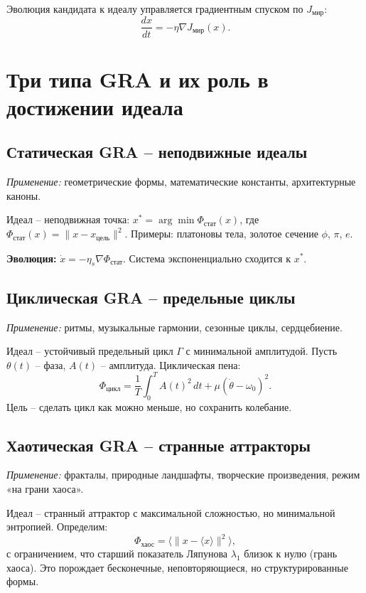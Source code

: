 \documentclass[12pt,a4paper]{article}
\begin{document}
Эволюция кандидата к идеалу управляется градиентным спуском по \(J_{\text{мир}}\):
\[
\frac{dx}{dt} = -\eta \nabla J_{\text{мир}}(x).
\]

\section{Три типа GRA и их роль в достижении идеала}

\subsection{Статическая GRA – неподвижные идеалы}

\emph{Применение:} геометрические формы, математические константы, архитектурные каноны.

Идеал – неподвижная точка: \(x^* = \arg\min \Phi_{\text{стат}}(x)\), где \(\Phi_{\text{стат}}(x) = \|x - x_{\text{цель}}\|^2\).  
Примеры: платоновы тела, золотое сечение \(\phi\), \(\pi\), \(e\).

\textbf{Эволюция:} \(\dot{x} = -\eta_s \nabla \Phi_{\text{стат}}\). Система экспоненциально сходится к \(x^*\).

\subsection{Циклическая GRA – предельные циклы}

\emph{Применение:} ритмы, музыкальные гармонии, сезонные циклы, сердцебиение.

Идеал – устойчивый предельный цикл \(\Gamma\) с минимальной амплитудой. Пусть \(\theta(t)\) – фаза, \(A(t)\) – амплитуда.  
Циклическая пена:
\[
\Phi_{\text{цикл}} = \frac{1}{T}\int_0^T A(t)^2\,dt + \mu (\dot{\theta} - \omega_0)^2.
\]
Цель – сделать цикл как можно меньше, но сохранить колебание.

\subsection{Хаотическая GRA – странные аттракторы}

\emph{Применение:} фракталы, природные ландшафты, творческие произведения, режим «на грани хаоса».

Идеал – странный аттрактор с максимальной сложностью, но минимальной энтропией. Определим:
\[
\Phi_{\text{хаос}} = \langle \|x - \langle x \rangle\|^2 \rangle,
\]
с ограничением, что старший показатель Ляпунова \(\lambda_1\) близок к нулю (грань хаоса). Это порождает бесконечные, неповторяющиеся, но структурированные формы.
\end{document}
